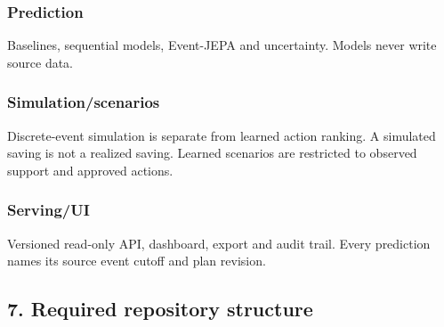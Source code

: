 \documentclass[
  spanish,
  10pt,
  a4paper,
]{article}
\begin{document}
\subsubsection{Prediction}\label{prediction}

Baselines, sequential models, Event-JEPA and uncertainty. Models never
write source data.

\subsubsection{Simulation/scenarios}\label{simulationscenarios}

Discrete-event simulation is separate from learned action ranking. A
simulated saving is not a realized saving. Learned scenarios are
restricted to observed support and approved actions.

\subsubsection{Serving/UI}\label{servingui}

Versioned read-only API, dashboard, export and audit trail. Every
prediction names its source event cutoff and plan revision.

\subsection{7. Required repository
structure}\label{7-required-repository-structure}
\end{document}
